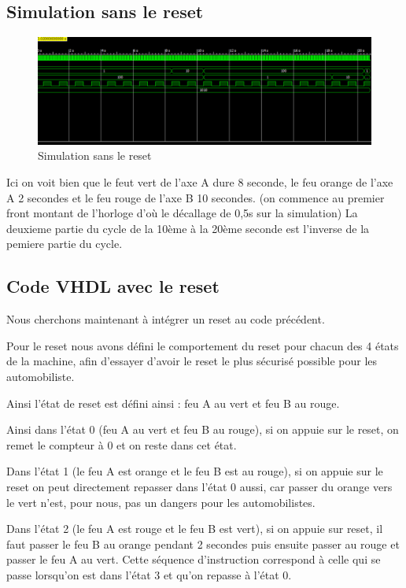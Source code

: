 \documentclass[11pt]{report}
\begin{document}
\subsection{Simulation sans le reset}

\begin{figure}[h]
\includegraphics[width=13cm]{TP03-5.png}
\caption{Simulation sans le reset}
\end{figure}
 Ici on voit bien que le feut vert de l'axe A dure 8 seconde, le feu orange de l'axe A 2 secondes et le feu rouge de l'axe B 10 secondes.
(on commence au premier front montant de l'horloge d'où le décallage de 0,5s sur la simulation)
 La deuxieme partie du cycle de la 10ème à la 20ème seconde est l'inverse de la pemiere partie du cycle.
\subsection{Code VHDL avec le reset}

Nous cherchons maintenant à intégrer un reset au code précédent.

Pour le reset nous avons défini le comportement du reset pour chacun des 4 états de la machine, afin d'essayer d'avoir le reset le plus sécurisé possible pour les automobiliste.

Ainsi l'état de reset est défini ainsi : feu A au vert et feu B au rouge.

Ainsi dans l'état 0 (feu A au vert et feu B au rouge), si on appuie sur le reset, on remet le compteur à 0 et on reste dans cet état.

Dans l'état 1 (le feu A est orange et le feu B est au rouge), si on appuie sur le reset on peut directement repasser dans l'état 0 aussi, car passer du orange vers le vert n'est, pour nous, pas un dangers pour les automobilistes.

Dans l'état 2 (le feu A est rouge et le feu B est vert), si on appuie sur reset, il faut passer le feu B au orange pendant 2 secondes puis ensuite passer au rouge et passer le feu A au vert. Cette séquence d'instruction correspond à celle qui se passe lorsqu'on est dans l'état 3 et qu'on repasse à l'état 0.
\end{document}
